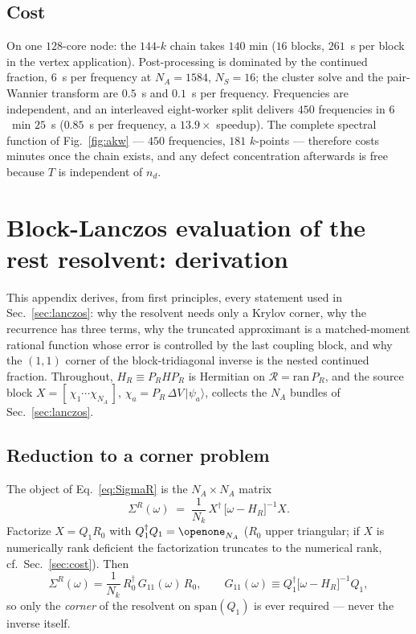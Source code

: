 \documentclass[aps,prx,reprint,superscriptaddress,nofootinbib,longbibliography]{revtex4-2}
\newcommand{\dV}{\Delta V}
\newcommand{\HR}{H_R}
\begin{document}
\subsection{Cost}

On one $128$-core node: the $144$-$k$ chain takes $140$ min ($16$ blocks,
$261$~s per block in the vertex application). Post-processing is dominated by
the continued fraction, $6$~s per frequency at $N_A = 1584$, $N_S = 16$; the
cluster solve and the pair-Wannier transform are $0.5$~s and $0.1$~s per
frequency. Frequencies are independent, and an interleaved eight-worker split
delivers $450$ frequencies in $6$~min $25$~s ($0.85$~s per frequency, a
$13.9\times$ speedup). The complete spectral function of
Fig.~\ref{fig:akw} --- $450$ frequencies, $181$ $k$-points --- therefore costs
minutes once the chain exists, and any defect concentration afterwards is free
because $T$ is independent of $n_d$.


\appendix

\section{Block-Lanczos evaluation of the rest resolvent: derivation}
\label{app:lanczos}

This appendix derives, from first principles, every statement used in
Sec.~\ref{sec:lanczos}: why the resolvent needs only a Krylov corner, why the
recurrence has three terms, why the truncated approximant is a matched-moment
rational function whose error is controlled by the last coupling block, and
why the $(1,1)$ corner of the block-tridiagonal inverse is the nested
continued fraction. Throughout, $\HR \equiv P_R H P_R$ is Hermitian on
$\mathcal{R}=\mathrm{ran}\,P_R$, and the source block
$X=[\,\chi_1\cdots\chi_{N_A}\,]$, $\chi_a = P_R\,\dV\,|\psi_a\rangle$,
collects the $N_A$ bundles of Sec.~\ref{sec:lanczos}.

\subsection{Reduction to a corner problem}

The object of Eq.~\eqref{eq:SigmaR} is the $N_A\times N_A$ matrix
\begin{equation}
  \Sigma^R(\omega) \;=\; \frac{1}{N_k}\, X^{\dagger}\,
  \big[\omega-\HR\big]^{-1} X .
  \label{eq:appSigma}
\end{equation}
Factorize $X=Q_1R_0$ with $Q_1^{\dagger}Q_1=\openone_{N_A}$ ($R_0$ upper
triangular; if $X$ is numerically rank deficient the factorization truncates
to the numerical rank, cf.\ Sec.~\ref{sec:cost}). Then
\begin{equation}
  \Sigma^R(\omega)=\frac{1}{N_k}\,R_0^{\dagger}\,
  G_{11}(\omega)\,R_0,
  \qquad
  G_{11}(\omega)\equiv Q_1^{\dagger}\big[\omega-\HR\big]^{-1}Q_1 ,
  \label{eq:corner}
\end{equation}
so only the \emph{corner} of the resolvent on $\mathrm{span}(Q_1)$ is ever
required --- never the inverse itself.
\end{document}
